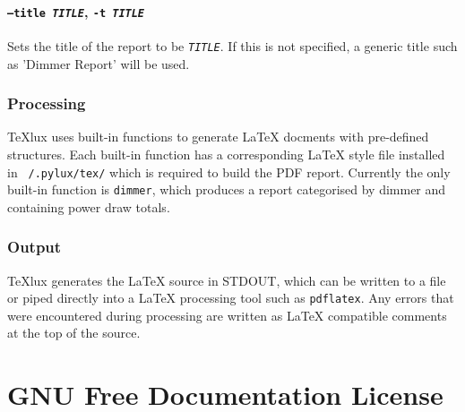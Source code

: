 \documentclass[a4paper]{article}
\begin{document}
\paragraph{\texttt{--title \textit{TITLE}}, \texttt{-t \textit{TITLE}}}
Sets the title of the report to be \texttt{\textit{TITLE}}. If this is not 
specified, a generic title such as 'Dimmer Report' will be used.

\subsubsection{Processing}

TeXlux uses built-in functions to generate \LaTeX{} docments with pre-defined 
structures. Each built-in function has a corresponding \LaTeX{} style file 
installed in \texttt{~/.pylux/tex/} which is required to build the PDF report. 
Currently the only built-in function is \texttt{dimmer}, which produces a 
report categorised by dimmer and containing power draw totals.

\subsubsection{Output}

TeXlux generates the \LaTeX{} source in STDOUT, which can be written to a 
file or piped directly into a \LaTeX{} processing tool such as 
\texttt{pdflatex}. Any errors that were encountered during processing are 
written as \LaTeX{} compatible comments at the top of the source.

\section{GNU Free Documentation License}

\end{document}
